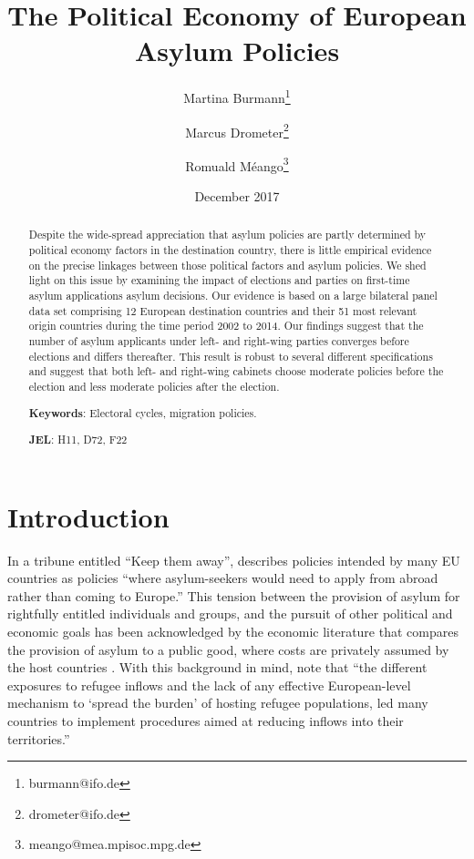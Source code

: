 \documentclass[a4paper,12pt]{article}
\title{The Political Economy of European Asylum Policies}
\date{December 2017}
\author[,1]{Martina Burmann\thanks{burmann@ifo.de}}
\author[,1]{Marcus Drometer\thanks{drometer@ifo.de}}
\author[,2]{Romuald M\'eango\thanks{meango@mea.mpisoc.mpg.de}}
\affil[1]{ifo Institute for Economic Research, Munich}
\affil[2]{Munich Center for the Economics of Aging (MEA)}
\begin{document}
      \maketitle

\begin{center}

\end{center}
\begin{abstract}
\singlespacing
\noindent 
Despite the wide-spread appreciation that asylum policies are partly determined by political economy factors in the destination country, there is little empirical evidence on the precise linkages between those political factors and asylum policies. We shed light on this issue by examining the impact of elections and parties on first-time asylum applications asylum decisions.  Our evidence is based on a large bilateral panel data set comprising 12 European destination countries and their 51 most relevant origin countries during the time period 2002 to 2014. Our findings suggest that  the number of asylum applicants under left- and right-wing parties converges before elections and differs thereafter. This result is robust to several different specifications and suggest that both left- and right-wing cabinets choose moderate policies before the election and less moderate policies after the election.

\bigskip

\textbf{Keywords}: Electoral cycles, migration policies.

\textbf{JEL}: H11, D72, F22

\bigskip
\end{abstract}
\setcounter{page}{0} \renewcommand{\thepage}{}
\pagebreak{}\pagebreak

\section{Introduction}\label{Introduction}
In a tribune entitled ``Keep them away'', \textit{\cite{Economist2017}} describes policies intended by many EU countries as policies ``where asylum-seekers would need to apply from abroad rather than coming to Europe.'' This tension between the provision of asylum for rightfully entitled individuals and groups, and the pursuit of other political and economic goals has been acknowledged by the economic literature that compares the provision of asylum to a public good, where costs are privately assumed by the host countries \citep{moraga2014}. With this background in mind, \cite{dustmann2016} note that ``the  different  exposures  to  refugee  inflows and  the  lack  of  any  effective  European-level  mechanism  to  `spread  the  burden'  of  hosting  refugee  populations,  led  many  countries  to  implement  procedures  aimed  at  reducing  inflows  into  their  territories.''
\end{document}
